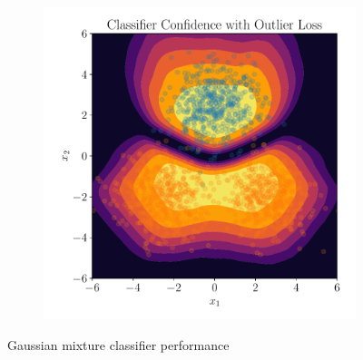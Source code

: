 \begin{figure}[htpb]
\begin{subfigure}[]{0.4\textwidth}
        \caption{}
        \label{fig:}
    \end{subfigure}
    \begin{subfigure}[]{0.4\textwidth}
        \centering
    \includegraphics[width=\linewidth]{figures/toy_example/gaussian_mixture/classifier_kl_confidence.pdf}
        \caption{}
        \label{fig:}
    \end{subfigure}
    
    \caption{Gaussian mixture classifier performance}%
    \label{fig:classifier_gmm}
\end{figure}

